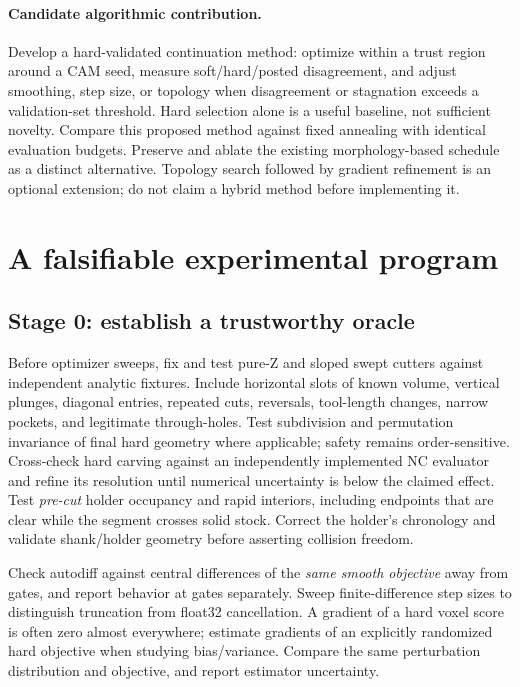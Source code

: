 \documentclass[11pt]{article}
\begin{document}
\paragraph{Candidate algorithmic contribution.}
Develop a hard-validated continuation method: optimize within a trust region
around a CAM seed, measure soft/hard/posted disagreement, and adjust smoothing,
step size, or topology when disagreement or stagnation exceeds a validation-set
threshold. Hard selection alone is a useful baseline, not sufficient novelty.
Compare this proposed method against fixed annealing with identical evaluation
budgets. Preserve and ablate the existing morphology-based schedule as a distinct
alternative. Topology search followed by gradient refinement is an optional
extension; do not claim a hybrid method before implementing it.

\section{A falsifiable experimental program}
\subsection{Stage 0: establish a trustworthy oracle}
Before optimizer sweeps, fix and test pure-Z and sloped swept cutters against
independent analytic fixtures. Include horizontal slots of known volume, vertical
plunges, diagonal entries, repeated cuts, reversals, tool-length changes, narrow
pockets, and legitimate through-holes. Test subdivision and permutation
invariance of final hard geometry where applicable; safety remains order-sensitive.
Cross-check hard carving against an independently implemented NC evaluator and
refine its resolution until numerical uncertainty is below the claimed effect.
Test \emph{pre-cut} holder occupancy and rapid interiors, including endpoints
that are clear while the segment crosses solid stock. Correct the holder's
chronology and validate shank/holder geometry before asserting collision freedom.

Check autodiff against central differences of the \emph{same smooth objective}
away from gates, and report behavior at gates separately. Sweep finite-difference
step sizes to distinguish truncation from float32 cancellation. A gradient of a
hard voxel score is often zero almost everywhere; estimate gradients of an
explicitly randomized hard objective when studying bias/variance. Compare the
same perturbation distribution and objective, and report estimator uncertainty.
\end{document}
